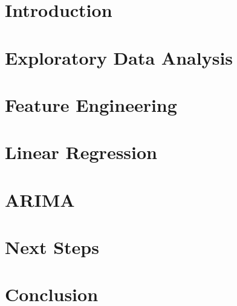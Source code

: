 





 

\begin{titlepage}


\end{titlepage}


\setcounter{savepage}{\value{page}}


\section{Introduction}


\section{Exploratory Data Analysis}


\section{Feature Engineering}


\section{Linear Regression}


\section{ARIMA}


\section{Next Steps}


\section{Conclusion}



\appendix
{}
\setcounter{page}{\numexpr\value{savepage}}





